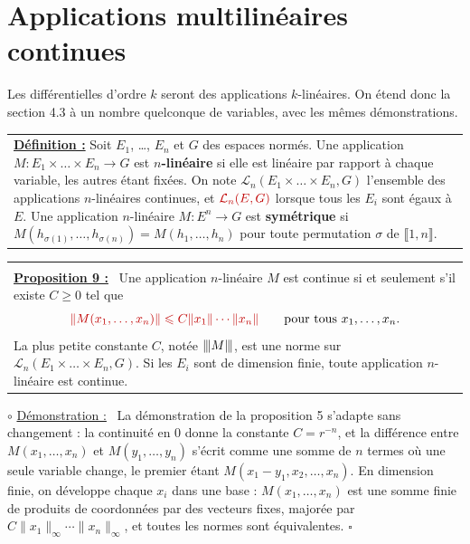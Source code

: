 \documentclass[a4paper,twoside]{report}
\makeatletter
\newcommand{\mot}[1]{\textcolor{rougecours}{\textbf{#1}}}
\newcommand{\rmath}[1]{\textcolor{rougecours}{#1}}
\newenvironment{cadre}%
 {\par\vspace{2mm}\noindent\begin{tabular}{|@{\hspace{4mm}}p{0.93\textwidth}@{\hspace{4mm}}|}
  \hline \\[-2mm]}%
 {\\[2mm] \hline \end{tabular}\par\vspace{3mm}}
\newcommand{\propo}[1]{\textbf{\underline{Proposition #1 :}}~}
\newenvironment{demo}%
 {\par\needspace{4\baselineskip}\vspace{1mm}\noindent$\circ$ \underline{Démonstration :}~\setlength{\parskip}{3pt plus 1pt}}%
 {\hfill$\square$\par\vspace{2mm}}
\newcommand{\norme}[1]{\lVert #1 \rVert}         %
\newcommand{\nop}[1]{|\mkern-1.5mu|\mkern-1.5mu|#1|\mkern-1.5mu|\mkern-1.5mu|}   %
\newcommand{\Lc}{\mathcal{L}}                     %
\makeatother
\begin{document}
\section[Applications multilinéaires]{Applications multilinéaires continues}

Les différentielles d'ordre $k$ seront des applications $k$-linéaires. On étend donc la section 4.3 à un nombre quelconque de variables, avec les mêmes démonstrations.

\begin{center}
\begin{tabularx}{15cm}{||X}
\noindent \textbf{\underline{Définition :}} Soit $E_{1}$, \dots, $E_{n}$ et $G$ des espaces normés. Une application $M : E_{1} \times \dots \times E_{n} \to G$ est \mot{$n$-linéaire} si elle est linéaire par rapport à chaque variable, les autres étant fixées. On note $\Lc_{n}(E_{1} \times \dots \times E_{n}, G)$ l'ensemble des applications $n$-linéaires continues, et $\rmath{\Lc_{n}(E, G)}$ lorsque tous les $E_{i}$ sont égaux à $E$. Une application $n$-linéaire $M : E^{n} \to G$ est \mot{symétrique} si $M(h_{\sigma(1)}, \dots, h_{\sigma(n)}) = M(h_{1}, \dots, h_{n})$ pour toute permutation $\sigma$ de $\llbracket 1, n \rrbracket$.
\end{tabularx}
\end{center}

\begin{cadre}
\propo{9} Une application $n$-linéaire $M$ est continue si et seulement s'il existe $C \geqslant 0$ tel que
\[ \rmath{\norme{M(x_{1}, \dots, x_{n})} \leqslant C\norme{x_{1}}\cdots\norme{x_{n}}} \qquad \text{pour tous } x_{1}, \dots, x_{n}. \]
La plus petite constante $C$, notée $\nop{M}$, est une norme sur $\Lc_{n}(E_{1} \times \dots \times E_{n}, G)$. Si les $E_{i}$ sont de dimension finie, toute application $n$-linéaire est continue.
\end{cadre}

\begin{demo}
La démonstration de la proposition 5 s'adapte sans changement : la continuité en $0$ donne la constante $C = r^{-n}$, et la différence entre $M(x_{1}, \dots, x_{n})$ et $M(y_{1}, \dots, y_{n})$ s'écrit comme une somme de $n$ termes où une seule variable change, le premier étant $M(x_{1} - y_{1}, x_{2}, \dots, x_{n})$. En dimension finie, on développe chaque $x_{i}$ dans une base : $M(x_{1}, \dots, x_{n})$ est une somme finie de produits de coordonnées par des vecteurs fixes, majorée par $C\norme{x_{1}}_{\infty}\cdots\norme{x_{n}}_{\infty}$, et toutes les normes sont équivalentes.
\end{demo}
\end{document}
